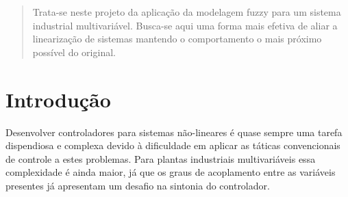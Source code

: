 \documentclass[a0,portrait]{a0poster}
\begin{document}
\vspace{2cm} %


\begin{multicols}{2} %


\color{NavyBlue} %
\begin{abstract}

\fontsize{18}{22}
Trata-se neste projeto da aplicação da modelagem fuzzy para um sistema industrial multivariável. Busca-se aqui uma forma mais efetiva de aliar a linearização de sistemas mantendo o comportamento o mais próximo possível do original.


\end{abstract}
\vspace{0.5cm}

\color{DarkSlateGray} %

\section*{Introdução}

\color{Black}

Desenvolver controladores para sistemas não-lineares é quase sempre uma tarefa dispendiosa e complexa devido à dificuldade em aplicar as táticas convencionais de controle a estes problemas. Para plantas industriais multivariáveis essa complexidade é ainda maior, já que os graus de acoplamento entre as variáveis presentes já apresentam um desafio na sintonia do controlador.  
\vspace{1cm}
\color{DarkSlateGray} %


\end{multicols}
\end{document}
